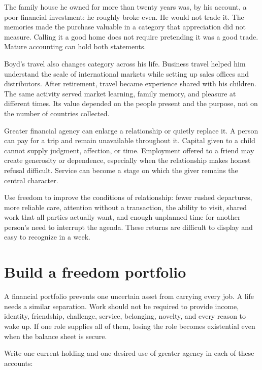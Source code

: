 The family house he owned for more than twenty years was, by his account, a
poor financial investment: he roughly broke even. He would not trade it. The
memories made the purchase valuable in a category that appreciation did not
measure. Calling it a good home does not require pretending it was a good
trade. Mature accounting can hold both statements.

Boyd's travel also changes category across his life. Business travel helped
him understand the scale of international markets while setting up sales
offices and distributors. After retirement, travel became experience shared
with his children. The same activity served market learning, family memory,
and pleasure at different times. Its value depended on the people present and
the purpose, not on the number of countries collected.

Greater financial agency can enlarge a relationship or quietly replace it. A
person can pay for a trip and remain unavailable throughout it. Capital given
to a child cannot supply judgment, affection, or time. Employment offered to a
friend may create generosity or dependence, especially when the relationship
makes honest refusal difficult. Service can become a stage on which the giver
remains the central character.

Use freedom to improve the conditions of relationship: fewer rushed
departures, more reliable care, attention without a transaction, the ability
to visit, shared work that all parties actually want, and enough unplanned time
for another person's need to interrupt the agenda. These returns are difficult
to display and easy to recognize in a week.

\section{Build a freedom portfolio}

A financial portfolio prevents one uncertain asset from carrying every job.
A life needs a similar separation. Work should not be required to provide
income, identity, friendship, challenge, service, belonging, novelty, and
every reason to wake up. If one role supplies all of them, losing the role
becomes existential even when the balance sheet is secure.

Write one current holding and one desired use of greater agency in each of
these accounts:

